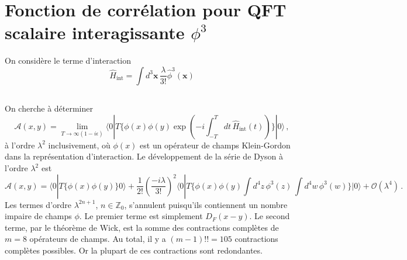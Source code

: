 \documentclass{article}
\numberwithin{equation}{section}
\theoremstyle{solution}
\begin{document}
\section{Fonction de corrélation pour QFT scalaire interagissante $\phi^{3}$}
On considère le terme d'interaction
\begin{equation}
        \hat{H}_{\mathrm{int}} = \int d^{3}\mathbf{x}\, \frac{\lambda}{3!} \hat{\phi}^{3}(\mathbf{x})
\end{equation} 

\subsection{}
On cherche à déterminer
\begin{equation}
       \mathcal{A}(x, y) = \lim\limits_{T \rightarrow  \infty (1 - i \epsilon)}\langle 0 | T \{ \phi(x) \phi(y) \exp \left( -i \int_{-T}^{T} dt\, \hat{H}_{\mathrm{int}}(t) \right) \} | 0 \rangle \, ,
\end{equation} 
à l'ordre $\lambda^{2}$ inclusivement, où $\phi(x)$ est un opérateur de champs Klein-Gordon dans la représentation d'interaction. Le développement 
de la série de Dyson à l'ordre $\lambda^{2}$ est
\begin{equation}
        \mathcal{A}(x, y) = \langle 0 | T \{\phi(x) \phi(y)\} 0 \rangle 
        +\frac{1}{2!} \left(\frac{-i\lambda}{ 3!}\right)^{2} \langle 0 | T \{\phi(x) \phi(y)  \int d^{4}z\, \phi^{3}(z)\, \int d^{4}w\, \phi^{3}(w) \} | 0 \rangle 
        + \mathcal{O}(\lambda^{4})\, .
\end{equation} 
Les termes d'ordre $\lambda^{2n + 1}$, $n \in \mathbb{Z}_{0}$, s'annulent puisqu'ils contiennent un nombre impaire de champs $\phi$.
Le premier terme est simplement $D_{F}(x - y)$. Le second terme, par le théorème de Wick, est la somme des contractions complètes 
de $m = 8$ opérateurs de champs. Au total, il y a $(m - 1)!! = 105$ contractions complètes possibles. Or la plupart de ces contractions sont 
redondantes. 
\end{document}

